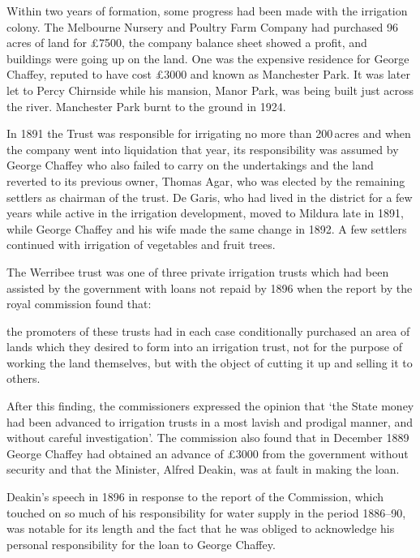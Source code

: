 Within two years of formation, some progress had been made with the
irrigation colony.  The Melbourne Nursery and Poultry Farm Company
 had
purchased 96\,acres of land for \pounds7500, the company balance sheet
showed a profit, and buildings were going up on the land.  One was the
expensive residence for George Chaffey, reputed to have cost
\pounds3000 and known as Manchester Park.  It was later let to 
Percy Chirnside while his mansion, Manor Park, was being built just
across the river.  Manchester Park burnt to the ground in
1924.

In 1891 the Trust was responsible for irrigating no more than
200\,acres and when the company went into liquidation that year, its
responsibility was assumed by George Chaffey who also failed to carry
on the undertakings and the land reverted to its previous owner,
Thomas Agar,  who was elected by the remaining
settlers as chairman of the trust.  De Garis, who had lived in the
district for a few years while active in the irrigation development,
moved to Mildura late in 1891, while George Chaffey and his wife made
the same change in 1892.  A few settlers continued with irrigation of
vegetables and fruit trees.

The Werribee trust was one of three private irrigation trusts which
had been assisted by the government with loans not repaid by 1896 when
the report by the royal commission found that:
\begin{Quote}
	the promoters of these trusts had in each case conditionally
	purchased an area of lands which they desired to form into an
	irrigation trust, not for the purpose of working the land
	themselves, but with the object of cutting it up and selling
	it to others.
\end{Quote}
After this finding, the commissioners expressed the opinion that `the
State money had been advanced to irrigation trusts in a most lavish
and prodigal manner, and without careful investigation'. The
commission also found that in December 1889 George Chaffey had
obtained an advance of \pounds3000 from the government without
security and that the Minister, Alfred Deakin, was at fault in making
the loan.

Deakin's speech in 1896 in response to the report of the Commission,
which touched on so much of his responsibility for water supply in the
period 1886--90, was notable for its length and the fact that he was
obliged to acknowledge his personal responsibility for the loan to
George Chaffey.

